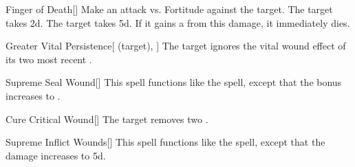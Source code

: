 \lowercase{\hypertarget{spell:Finger of Death}{}}\label{spell:Finger of Death}
\begin{freeability}[\nth{5}]{\hypertarget{spell:Finger of Death}{Finger of Death}}[]
Make an attack vs. Fortitude against the target.
\hit The target takes  \plus2d.
\crit The target takes  \plus5d.
If it gains a  from this damage, it immediately dies.
\end{freeability}
\vspace{0.25em}



\lowercase{\hypertarget{spell:Greater Vital Persistence}{}}\label{spell:Greater Vital Persistence}
\begin{attuneability}[\nth{5}]{\hypertarget{spell:Greater Vital Persistence}{Greater Vital Persistence}}[ (target), ]
The target ignores the vital wound effect of its two most recent .
\end{attuneability}
\vspace{0.25em}



\lowercase{\hypertarget{spell:Supreme Seal Wound}{}}\label{spell:Supreme Seal Wound}
\begin{freeability}[\nth{5}]{\hypertarget{spell:Supreme Seal Wound}{Supreme Seal Wound}}[]
This spell functions like the  spell, except that the bonus increases to .
\end{freeability}
\vspace{0.25em}



\lowercase{\hypertarget{spell:Cure Critical Wound}{}}\label{spell:Cure Critical Wound}
\begin{apability}[\nth{6}]{\hypertarget{spell:Cure Critical Wound}{Cure Critical Wound}}[]
The target removes two .
\end{apability}
\vspace{0.25em}



\lowercase{\hypertarget{spell:Supreme Inflict Wounds}{}}\label{spell:Supreme Inflict Wounds}
\begin{freeability}[\nth{7}]{\hypertarget{spell:Supreme Inflict Wounds}{Supreme Inflict Wounds}}[]
This spell functions like the  spell, except that the damage increases to  \plus5d.
\end{freeability}
\vspace{0.25em}



